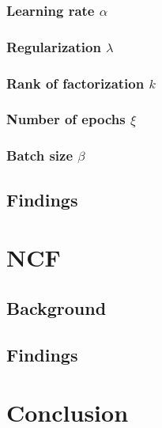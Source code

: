 \documentclass[final]{cvpr}
\begin{document}
\subsubsection{Learning rate $\alpha$}
\subsubsection{Regularization $\lambda$}
\subsubsection{Rank of factorization $k$}
\subsubsection{Number of epochs $\xi$}
\subsubsection{Batch size $\beta$}

\subsection{Findings}


\section{\ac{NCF}}
\subsection{Background}

\subsection{Findings}


\section{Conclusion}

{\small
	
	
}
\end{document}
